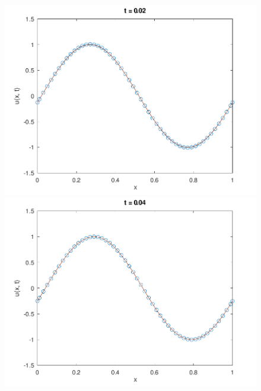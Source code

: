\documentclass[
	8pt,
	professionalfonts,
	leqno,
	intlimits,
	c,
    aspectratio=1610,
]{beamer}
\begin{document}
\begin{frame}
    \begin{figure}[H]
        \centering
        \includegraphics[width=.4\paperwidth]{../examples/octave/hyperbolic1D1.pdf}
        \includegraphics[width=.4\paperwidth]{../examples/octave/hyperbolic1D2.pdf}


\end{figure}
\end{frame}
\end{document}
